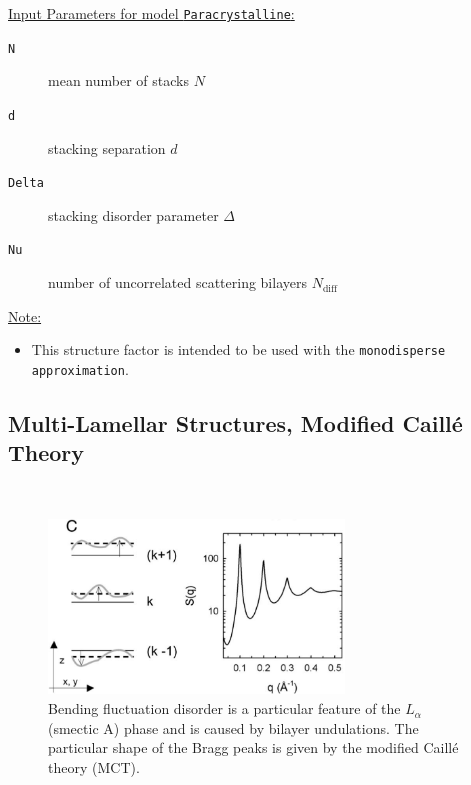 \vspace{5mm}

\noindent
\underline{Input Parameters for model \texttt{Paracrystalline}:}
\begin{description}
\item[\texttt{N}] mean number of stacks $N$
\item[\texttt{d}] stacking separation $d$
\item[\texttt{Delta}]  stacking disorder parameter $\Delta$
\item[\texttt{Nu}]   number of uncorrelated scattering bilayers $N_\text{diff}$
\end{description}

\noindent\underline{Note:}
\begin{itemize}
\item This structure factor is intended to be used with the \texttt{monodisperse approximation}.
\end{itemize}


\clearpage
\subsection{Multi-Lamellar Structures, Modified Caill\'e Theory} ~\\

\begin{figure}[htb]
\begin{center}
\includegraphics[width=0.7\textwidth,height=0.4\textwidth]{ModifiedCailleTheorySQ.png}
\end{center}
\caption{Bending fluctuation disorder is a particular feature of
the $L_\alpha$ (smectic A) phase and is caused by bilayer
undulations. The particular shape of the Bragg peaks is given by
the modified Caill\'e theory (MCT).}
\label{ModifiedCailleTheorySQ}
\end{figure}

